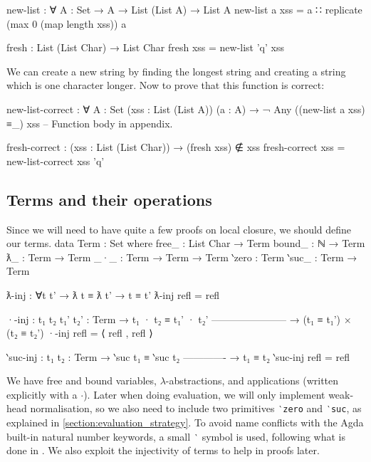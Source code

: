 \documentclass[logo,bsc,singlespacing,parskip,online]{infthesis}
\renewenvironment{code}{\mintedcopy[breaklines,breaksymbolleft=\;]{agda}}{\endmintedcopy}
\begin{document}
\begin{code}
new-list : ∀ {A : Set} → A → List (List A) → List A
new-list a xss = a ∷ replicate (max 0 (map length xss)) a

fresh : List (List Char) → List Char
fresh xss = new-list 'q' xss
\end{code}

We can create a new string by finding the longest string and creating a string which is one
character longer. Now to prove that this function is correct:

\begin{code}

new-list-correct : ∀ {A : Set} (xss : List (List A)) (a : A)
  → ¬ Any ((new-list a xss) ≡_) xss
-- Function body in appendix.

fresh-correct : (xss : List (List Char)) → (fresh xss) ∉ xss
fresh-correct xss = new-list-correct xss 'q'
\end{code}

\subsection{Terms and their operations}
\label{section:stlc_terms}
Since we will need to have quite a few proofs on local closure, we should define our terms.
\begin{code}
data Term : Set where
  free_  : List Char → Term
  bound_ : ℕ → Term
  ƛ_     : Term → Term
  _·_    : Term → Term → Term
  ‵zero  : Term
  ‵suc_  : Term → Term

ƛ-inj : ∀{t t'} → ƛ t ≡ ƛ t' → t ≡ t'
ƛ-inj refl = refl

·-inj : {t₁ t₂ t₁' t₂' : Term}
  → t₁ · t₂ ≡ t₁' · t₂'
    -----------------------
  → (t₁ ≡ t₁') × (t₂ ≡ t₂')
·-inj refl = ⟨ refl , refl ⟩

‵suc-inj : {t₁ t₂ : Term}
  → ‵suc t₁ ≡ ‵suc t₂
    -------------
  → t₁ ≡ t₂
‵suc-inj refl = refl
\end{code}

We have free and bound variables, $\lambda$-abstractions, and applications (written explicitly with
a $\cdot$). Later when doing evaluation, we will only implement weak-head normalisation, so we also
need to include two primitives \texttt{‵zero} and \texttt{‵suc}, as explained in
\ref{section:evaluation_strategy}. To avoid name conflicts with the Agda built-in natural number
keywords, a small \texttt{‵} symbol is used, following what is done in
\citet{wadler_programming_2022}. We also exploit the injectivity of terms to help in proofs later.
\end{document}
